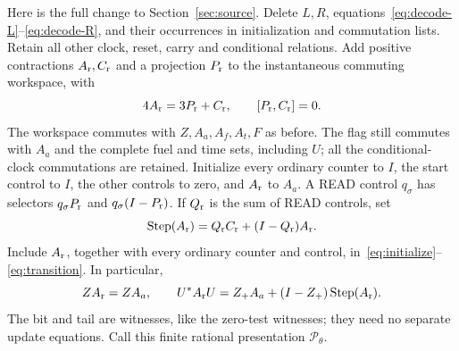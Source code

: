 Here is the full change to Section~\ref{sec:source}. Delete $L,R$, equations~\eqref{eq:decode-L}--\eqref{eq:decode-R}, and their occurrences in initialization and commutation lists. Retain all other clock, reset, carry and conditional relations. Add positive contractions $A_{\rm r},C_{\rm r}$ and a projection $P_{\rm r}$ to the instantaneous commuting workspace, with
\begin{equation}\label{eq:reader-domain}
 4A_{\rm r}=3P_{\rm r}+C_{\rm r},\qquad [P_{\rm r},C_{\rm r}]=0.
\end{equation}
The workspace commutes with $Z,A_a,A_f,A_t,F$ as before. The flag still commutes with $A_a$ and the complete fuel and time sets, including $U$; all the conditional-clock commutations are retained. Initialize every ordinary counter to $I$, the start control to $I$, the other controls to zero, and $A_{\rm r}$ to $A_a$. A READ control $q_\sigma$ has selectors $q_\sigma P_{\rm r}$ and $q_\sigma(I-P_{\rm r})$. If $Q_{\rm r}$ is the sum of READ controls, set
\begin{equation}\label{eq:reader-step}
 \operatorname{Step}(A_{\rm r})=Q_{\rm r}C_{\rm r}+(I-Q_{\rm r})A_{\rm r}.
\end{equation}
Include $A_{\rm r}$, together with every ordinary counter and control, in~\eqref{eq:initialize}--\eqref{eq:transition}. In particular,
\[
 ZA_{\rm r}=ZA_a,\qquad
 U^*A_{\rm r}U=Z_+A_a+(I-Z_+)\operatorname{Step}(A_{\rm r}).
\]
The bit and tail are witnesses, like the zero-test witnesses; they need no separate update equations. Call this finite rational presentation $\mathcal P_\theta$.

